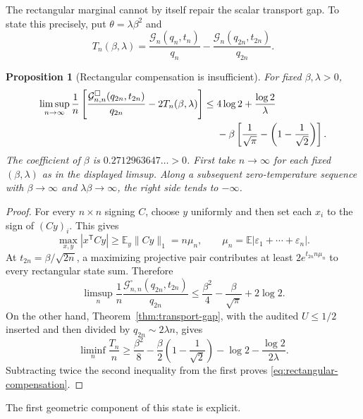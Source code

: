 \documentclass[11pt]{article}
\newtheorem{proposition}[theorem]{Proposition}
\newcommand{\E}{\mathbb E}
\begin{document}
The rectangular marginal cannot by itself repair the scalar transport gap.
To state this precisely, put $\theta=\lambda\beta^2$ and
\[
 T_n(\beta,\lambda)
 =\frac{\mathcal G_n(q_n,t_n)}{q_n}
 -\frac{\mathcal G_n(q_{2n},t_{2n})}{q_{2n}}.
\]

\begin{proposition}[Rectangular compensation is insufficient]
\label{prop:rectangular-compensation}
For fixed $\beta,\lambda>0$,
\begin{align}
\limsup_{n\to\infty}\frac1n\left[
 \frac{\mathcal G_{n,n}^{\square}(q_{2n},t_{2n})}{q_{2n}}
 -2T_n(\beta,\lambda)\right]
 \le{}&4\log2+\frac{\log2}{\lambda}\notag\\
 &-\beta\left[
 \frac1{\sqrt\pi}-\left(1-\frac1{\sqrt2}\right)\right].
 \label{eq:rectangular-compensation}
\end{align}
The coefficient of $\beta$ is $0.2712963647\ldots>0$.  First take
$n\to\infty$ for each fixed $(\beta,\lambda)$ as in the displayed limsup.
Along a subsequent zero-temperature sequence with $\beta\to\infty$ and
$\lambda\beta\to\infty$, the right side tends to $-\infty$.
\end{proposition}

\begin{proof}
For every $n\times n$ signing $C$, choose $y$ uniformly and then set each
$x_i$ to the sign of $(Cy)_i$.  This gives
\[
 \max_{x,y}|x^{\mathsf T}Cy|
 \ge\E_y\|Cy\|_1=n\mu_n,
 \qquad
 \mu_n=\E|\varepsilon_1+\cdots+\varepsilon_n|.
\]
At $t_{2n}=\beta/\sqrt{2n}$, a maximizing projective pair contributes at
least $2e^{t_{2n}n\mu_n}$ to every rectangular state sum.  Therefore
\[
 \limsup_n\frac1n
 \frac{\mathcal G_{n,n}^{\square}(q_{2n},t_{2n})}{q_{2n}}
 \le\frac{\beta^2}{4}-\frac\beta{\sqrt\pi}+2\log2.
\]
On the other hand, Theorem~\ref{thm:transport-gap}, with the audited
$U\le1/2$ inserted and then divided by $q_{2n}\sim2\lambda n$, gives
\[
 \liminf_n\frac{T_n}{n}
 \ge\frac{\beta^2}{8}
 -\frac\beta2\left(1-\frac1{\sqrt2}\right)
 -\log2-\frac{\log2}{2\lambda}.
\]
Subtracting twice the second inequality from the first proves
\eqref{eq:rectangular-compensation}.
\end{proof}

The first geometric component of this state is explicit.
\end{document}
